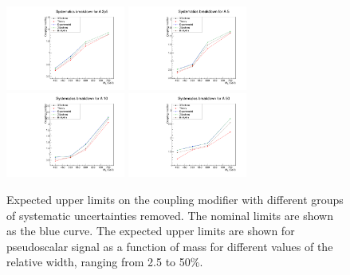 \begin{figure}[!Hhtb]
\centering
\includegraphics[width=0.35\textwidth,keepaspectratio=true]{fig/app5/breakdowns/generic_breakdown_A_2p5.pdf}
\includegraphics[width=0.35\textwidth,keepaspectratio=true]{fig/app5/breakdowns/generic_breakdown_A_5.pdf}
\includegraphics[width=0.35\textwidth,keepaspectratio=true]{fig/app5/breakdowns/generic_breakdown_A_10.pdf}
\includegraphics[width=0.35\textwidth,keepaspectratio=true]{fig/app5/breakdowns/generic_breakdown_A_50.pdf}
\caption{Expected upper limits on the coupling modifier with different groups of systematic uncertainties removed. The nominal limits are shown as the blue curve. The expected upper limits are shown for pseudoscalar signal as a function of mass for different values of the relative width, ranging from 2.5 to 50\%.}
\label{fig:breakdown_awidths}
\end{figure}
